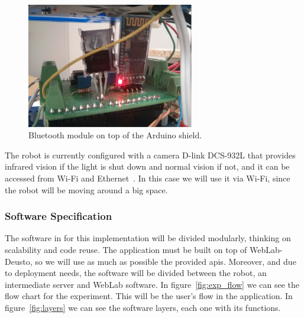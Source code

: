 \begin{figure}[!htbp]
	\centering
	\includegraphics[width=0.65\textwidth]{fig/bluetooth}
	\caption{Bluetooth module on top of the Arduino shield.}
	\label{fig:bluetooth}
\end{figure}

The robot is currently configured with a camera D-link DCS-932L that provides infrared vision if the
light is shut down and normal vision if not, and it can be accessed from Wi-Fi and
Ethernet~\cite{camera}. In this case we will use it via Wi-Fi, since the robot will be moving around
a big space.

\subsubsection{Software Specification}

The software in for this implementation will be divided modularly, thinking on scalability and
code reuse. The application must be built on top of WebLab-Deusto, so we will use as much as
possible the provided \acrshort{api}s. Moreover, and due to deployment needs, the software will be
divided between the robot, an intermediate server and WebLab software. In figure~\ref{fig:exp_flow}
we can see the flow chart for the experiment. This will be the user's flow in the application. In
figure~\ref{fig:layers} we can see the software layers, each one with its functions.

